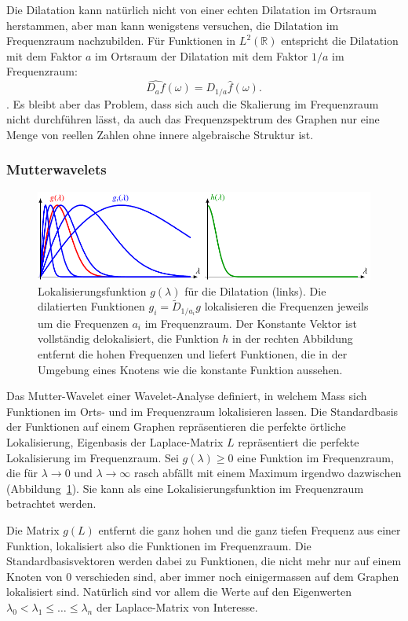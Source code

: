 Die Dilatation kann natürlich nicht von einer echten
Dilatation im Ortsraum herstammen, aber man kann wenigstens versuchen, die
Dilatation im Frequenzraum nachzubilden.
Für Funktionen in $L^2(\mathbb{R})$ entspricht die Dilatation mit dem
Faktor $a$ im Ortsraum der Dilatation mit dem Faktor $1/a$ im Frequenzraum:
\[
\widehat{D_af}(\omega) = D_{1/a}\hat{f}(\omega).
\]
\cite[Satz~3.14]{buch:mathsem-wavelets}.
Es bleibt aber das Problem, dass sich auch die Skalierung im Frequenzraum
nicht durchführen lässt, da auch das Frequenzspektrum des Graphen nur eine
Menge von reellen Zahlen ohne innere algebraische Struktur ist.

\subsubsection{Mutterwavelets}
\begin{figure}
\centering
\includegraphics{chapters/70-graphen/images/gh.pdf}
\caption{Lokalisierungsfunktion $g(\lambda)$ für die Dilatation (links).
Die dilatierten Funktionen $g_i=\tilde{D}_{1/a_i}g$ lokalisieren
die Frequenzen jeweils um die Frequenzen $a_i$ im Frequenzraum.
Der Konstante Vektor ist vollständig delokalisiert, die Funktion $h$
in der rechten Abbildung entfernt die hohen Frequenzen und liefert Funktionen,
die in der Umgebung eines Knotens wie die konstante Funktion aussehen.
\label{buch:graphs:fig:lokalisierung}}
\end{figure}
Das Mutter-Wavelet einer Wavelet-Analyse definiert, in welchem Mass
sich Funktionen im Orts- und im Frequenzraum lokalisieren lassen.
Die Standardbasis der Funktionen auf einem Graphen repräsentieren die
perfekte örtliche Lokalisierung, Eigenbasis der Laplace-Matrix $L$ repräsentiert
die perfekte Lokalisierung im Frequenzraum.
Sei $g(\lambda)\ge 0$ eine Funktion im Frequenzraum, die für  $\lambda\to0$ und
$\lambda\to\infty$ rasch abfällt mit einem Maximum irgendwo dazwischen
(Abbildung~\ref{buch:graphs:fig:lokalisierung}).
Sie kann als eine Lokalisierungsfunktion im Frequenzraum betrachtet werden.

Die Matrix $g(L)$ entfernt die ganz hohen und die ganz tiefen Frequenz
aus einer Funktion, lokalisiert also die Funktionen im Frequenzraum.
Die Standardbasisvektoren werden dabei zu Funktionen, die nicht mehr nur
auf einem Knoten von $0$ verschieden sind, aber immer noch einigermassen
auf dem Graphen lokalisiert sind.
Natürlich sind vor allem die Werte auf den Eigenwerten
$\lambda_0 < \lambda_1\le \dots\le \lambda_n$ der Laplace-Matrix
von Interesse.

